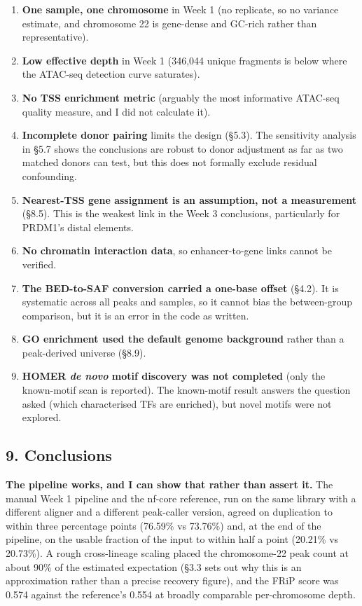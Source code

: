 \documentclass[
  11pt,
  a4paper,
]{article}
\providecommand{\tightlist}{%
  \setlength{\itemsep}{0pt}\setlength{\parskip}{0pt}}
\begin{document}
\begin{enumerate}
\def\labelenumi{\arabic{enumi}.}
\tightlist
\item
  \textbf{One sample, one chromosome} in Week 1 (no replicate, so no
  variance estimate, and chromosome 22 is gene-dense and GC-rich rather
  than representative).
\item
  \textbf{Low effective depth} in Week 1 (346,044 unique fragments is
  below where the ATAC-seq detection curve saturates).
\item
  \textbf{No TSS enrichment metric} (arguably the most informative
  ATAC-seq quality measure, and I did not calculate it).
\item
  \textbf{Incomplete donor pairing} limits the design (§5.3). The
  sensitivity analysis in §5.7 shows the conclusions are robust to donor
  adjustment as far as two matched donors can test, but this does not
  formally exclude residual confounding.
\item
  \textbf{Nearest-TSS gene assignment is an assumption, not a
  measurement} (§8.5). This is the weakest link in the Week 3
  conclusions, particularly for PRDM1's distal elements.
\item
  \textbf{No chromatin interaction data}, so enhancer-to-gene links
  cannot be verified.
\item
  \textbf{The BED-to-SAF conversion carried a one-base offset} (§4.2).
  It is systematic across all peaks and samples, so it cannot bias the
  between-group comparison, but it is an error in the code as written.
\item
  \textbf{GO enrichment used the default genome background} rather than
  a peak-derived universe (§8.9).
\item
  \textbf{HOMER \emph{de novo} motif discovery was not completed} (only
  the known-motif scan is reported). The known-motif result answers the
  question asked (which characterised TFs are enriched), but novel
  motifs were not explored.
\end{enumerate}

\hypertarget{conclusions}{%
\subsection{9. Conclusions}\label{conclusions}}

\textbf{The pipeline works, and I can show that rather than assert it.}
The manual Week 1 pipeline and the nf-core reference, run on the same
library with a different aligner and a different peak-caller version,
agreed on duplication to within three percentage points (76.59\% vs
73.76\%) and, at the end of the pipeline, on the usable fraction of the
input to within half a point (20.21\% vs 20.73\%). A rough cross-lineage
scaling placed the chromosome-22 peak count at about 90\% of the
estimated expectation (§3.3 sets out why this is an approximation rather
than a precise recovery figure), and the FRiP score was 0.574 against
the reference's 0.554 at broadly comparable per-chromosome depth.
\end{document}
